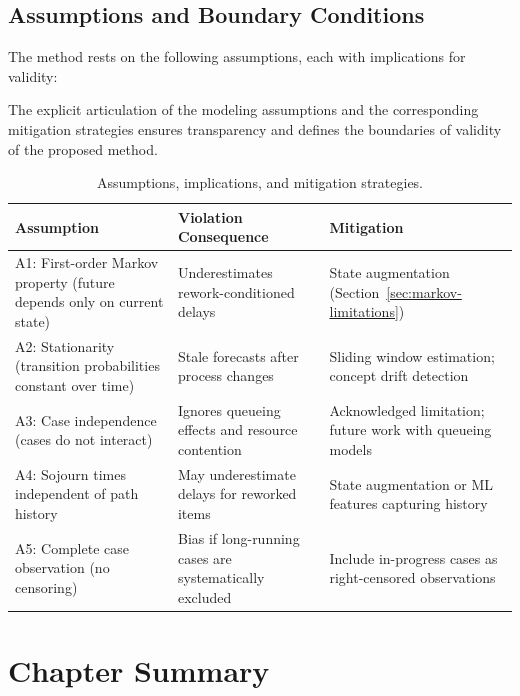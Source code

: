 \subsection{Assumptions and Boundary Conditions}
\label{sec:assumptions}

The method rests on the following assumptions, each with implications 
for validity:

The explicit articulation of the modeling assumptions and the corresponding mitigation strategies ensures transparency and defines the boundaries of validity of the proposed method.

\begin{table}[htbp]
\centering
\caption{Assumptions, implications, and mitigation strategies.}
\label{tab:assumptions}
\small
\begin{tabular}{p{3.5cm}p{4cm}p{4cm}}
\toprule
\textbf{Assumption} & \textbf{Violation Consequence} & \textbf{Mitigation} \\
\midrule
A1: First-order Markov property (future depends only on current state) & 
    Underestimates rework-conditioned delays & 
    State augmentation (Section~\ref{sec:markov-limitations}) \\
\midrule
A2: Stationarity (transition probabilities constant over time) & 
    Stale forecasts after process changes & 
    Sliding window estimation; concept drift detection \\
\midrule
A3: Case independence (cases do not interact) & 
    Ignores queueing effects and resource contention & 
    Acknowledged limitation; future work with queueing models \\
\midrule
A4: Sojourn times independent of path history & 
    May underestimate delays for reworked items & 
    State augmentation or ML features capturing history \\
\midrule
A5: Complete case observation (no censoring) & 
    Bias if long-running cases are systematically excluded & 
    Include in-progress cases as right-censored observations \\
\bottomrule
\end{tabular}
\end{table}


\section{Chapter Summary}
\label{sec:method-summary}

